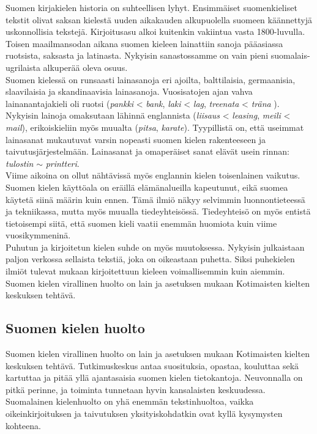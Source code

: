 \begin{multicols}{2}
Suomen kirjakielen historia on suhteellisen lyhyt. Ensimmäiset suomenkieliset
tekstit olivat saksan kielestä uuden aikakauden alkupuolella suomeen
käännettyjä uskonnollisia tekstejä. Kirjoitusasu alkoi kuitenkin vakiintua
vasta 1800-luvulla. Toisen maailmansodan aikana suomen kieleen lainattiin
sanoja pääasiassa ruotsista, saksasta ja latinasta. Nykyisin sanastossamme on
vain pieni suomalais-ugrilaista alkuperää oleva osuus.\\
Suomen kielessä on runsaasti lainasanoja eri ajoilta, balttilaisia,
germaanisia, slaavilaisia ja skandinaavisia lainasanoja. Vuosisatojen
ajan vahva lainanantajakieli oli ruotsi (\textit{pankki} <
\textit{bank}, \textit{laki} < \textit{lag}, \textit{treenata} <
\textit{träna} ). Nykyisin lainoja omaksutaan lähinnä englannista
(\textit{liisaus} < \textit{leasing}, \textit{meili} < \textit{mail}),
erikoiskieliin myös muualta (\textit{pitsa},
\textit{karate}). Tyypillistä on, että useimmat lainasanat mukautuvat
varsin nopeasti suomen kielen rakenteeseen ja
taivutusjärjestelmään. Lainasanat ja omaperäiset sanat elävät usein
rinnan: \textit{tulostin} $\sim$ \textit{printteri}.\\
Viime aikoina on ollut nähtävissä myös englannin kielen toisenlainen vaikutus.
Suomen kielen käyttöala on eräillä elämänalueilla kapeutunut, eikä suomea
käytetä siinä määrin kuin ennen. Tämä ilmiö näkyy selvimmin luonnontieteessä ja
tekniikassa, mutta myös muualla tiedeyhteisössä. Tiedeyhteisö on myös entistä
tietoisempi siitä, että suomen kieli vaatii enemmän huomiota kuin viime
vuosikymmeninä.\\
Puhutun ja kirjoitetun kielen suhde on myös muutoksessa. Nykyisin julkaistaan
paljon verkossa sellaista tekstiä, joka on oikeastaan puhetta. Siksi puhekielen
ilmiöt tulevat mukaan kirjoitettuun kieleen voimallisemmin kuin aiemmin.\\
Suomen kielen virallinen huolto on lain ja asetuksen mukaan Kotimaisten kielten
keskuksen tehtävä.


\subsection{Suomen kielen huolto}

Suomen kielen virallinen huolto on lain ja asetuksen mukaan Kotimaisten kielten
keskuksen tehtävä. Tutkimuskeskus antaa suosituksia, opastaa, kouluttaa
sekä kartuttaa ja pitää yllä ajantasaisia suomen kielen tietokantoja.
Neuvonnalla on pitkä perinne, ja toiminta tunnetaan hyvin kansalaisten
keskuudessa. Suomalainen kielenhuolto on yhä enemmän tekstinhuoltoa, vaikka
oikeinkirjoituksen ja taivutuksen yksityiskohdatkin ovat kyllä kysymysten
kohteena.


\end{multicols}
